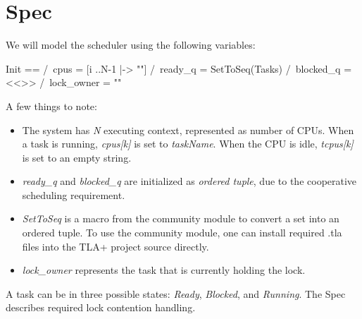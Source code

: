 \section{Spec}

We will model the scheduler using the following variables:\newline
\begin{tla}
Init ==
    /\ cpus = [i ..N-1 |-> ""] 
    /\ ready_q = SetToSeq(Tasks)
    /\ blocked_q = <<>>
    /\ lock_owner = ""
\end{tla}
\begin{tlatex}
%
%
%
%
\end{tlatex}
\newline

A few things to note:
\begin{itemize}
    \item The system has \textit{N} executing context, represented as number of CPUs.
    When a task is running, \textit{cpus[k]} is set to \textit{taskName}. When the CPU is idle,
    \textit{tcpus[k]} is set to an empty string. 
    \item \textit{ready\_q} and \textit{blocked\_q} are initialized as \textit{ordered tuple},
    due to the cooperative scheduling requirement.
    \item \textit{SetToSeq} is a macro from the community module \cite{tla_comm}
    to convert a set into an ordered tuple. To use the community module, one can
    install required .tla files into the TLA+ project source directly.
    \item \textit{lock\_owner} represents the task that is currently holding the lock. 
\end{itemize}

A task can be in three possible states: \textit{Ready}, \textit{Blocked}, and
\textit{Running}. The Spec describes required lock contention handling.\newline

